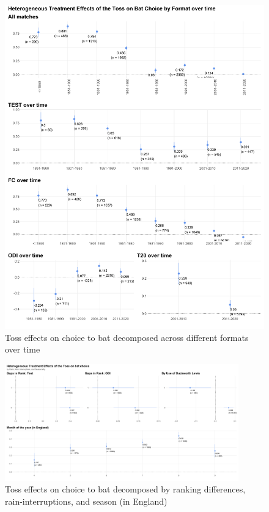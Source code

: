 \documentclass[11pt,  letterpaper]{article}
\begin{document}
\begin{figure}
 \centering
 \includegraphics[width=\textwidth,keepaspectratio]{output/first_stage_by_format_overtime.pdf}
 \caption{Toss effects on choice to bat decomposed across different formats
 over time}
 \label{fig:fs_het_TE2}
\end{figure}


\begin{figure}
 \centering
 \includegraphics[width=0.9\textwidth,keepaspectratio]{output/first_stage_by_rank_dl_season.pdf}
 \caption{Toss effects on choice to bat decomposed by ranking differences, rain-interruptions, and season (in England)}
 \label{fig:fs_het_TE3}
\end{figure}
\end{document}
